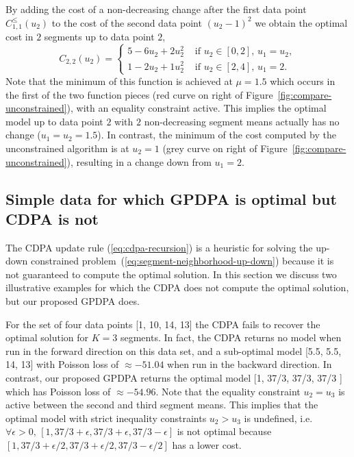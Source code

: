\documentclass[twoside,11pt]{article}
\begin{document}
By adding the cost of a non-decreasing change after the first data
point $C_{1,1}^\leq(u_2)$ to the cost of the second data point
$(u_2-1)^2$ we obtain the optimal cost in $2$ segments up to data
point $2$,
\begin{equation}
  C_{2,2}(u_2) = 
  \begin{cases}
    5 - 6 u_2 + 2 u_2^2 &\text{ if }u_2\in[0,2],\,  u_1=u_2,\\
    1 - 2 u_2 + 1 u_2^2 &\text{ if }u_2\in[2,4],\,  u_1=2.
  \end{cases}
\end{equation}
Note that the minimum of this function is achieved at $\mu=1.5$ which
occurs in the first of the two function pieces (red curve on right of
Figure~\ref{fig:compare-unconstrained}), with an equality constraint
active. This implies the optimal model up to data point $2$ with
$2$ non-decreasing segment means actually has no change
($u_1=u_2=1.5$). In contrast, the minimum of the cost computed by the
unconstrained algorithm is at $u_2=1$ (grey curve on right of
Figure~\ref{fig:compare-unconstrained}), resulting in a change down
from $u_1=2$.


\subsection{Simple data for which GPDPA is optimal
  but CDPA is not} 

The CDPA update rule (\ref{eq:cdpa-recursion}) is a heuristic for
solving the up-down constrained problem~(\ref{eq:segment-neighborhood-up-down}) because it is not
guaranteed to compute the optimal solution. In this section we discuss
two illustrative examples for which the CDPA does not compute the optimal
solution, but our proposed GPDPA does.

For the set of four data points [1, 10, 14, 13] the CDPA fails to recover
the optimal solution for $K=3$ segments. In fact, the CDPA returns no
model when run in the forward direction on this data set, and a
sub-optimal model [5.5, 5.5, 14, 13] with Poisson loss of
$\approx -51.04$ when run in the backward direction. In contrast, our
proposed GPDPA returns the optimal model [1, 37/3, 37/3, 37/3 ] which
has Poisson loss of $\approx -54.96$. Note that the equality
constraint $u_2=u_3$ is active between the second and third segment
means. This implies that the optimal model with strict inequality
constraints $u_2>u_3$ is undefined, i.e. $\forall \epsilon>0,\, [1, 37/3
+ \epsilon, 37/3 + \epsilon, 37/3 - \epsilon]$ is not optimal because
$[1, 37/3 + \epsilon/2, 37/3 +\epsilon/2, 37/3 - \epsilon/2]$ has a
lower cost.
\end{document}
